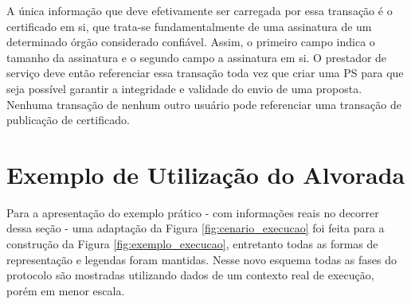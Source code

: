 A única informação que deve efetivamente ser carregada por essa transação é o certificado em si, que trata-se fundamentalmente de uma assinatura de um determinado órgão considerado confiável. Assim, o primeiro campo indica o tamanho da assinatura e o segundo campo a assinatura em si. O prestador de serviço deve então referenciar essa transação toda vez que criar uma \ac{PS} para que seja possível garantir a integridade e validade do envio de uma proposta. Nenhuma transação de nenhum outro usuário pode referenciar uma transação de publicação de certificado. 



\section{Exemplo de Utilização do Alvorada}
\label{sec:proposta:exemplo}

Para a apresentação do exemplo prático - com informações reais no decorrer dessa seção - uma adaptação da Figura \ref{fig:cenario_execucao} foi feita para a construção da Figura \ref{fig:exemplo_execucao}, entretanto todas as formas de representação e legendas foram mantidas. Nesse novo esquema todas as fases do protocolo são mostradas utilizando dados de um contexto real de execução, porém em menor escala.

